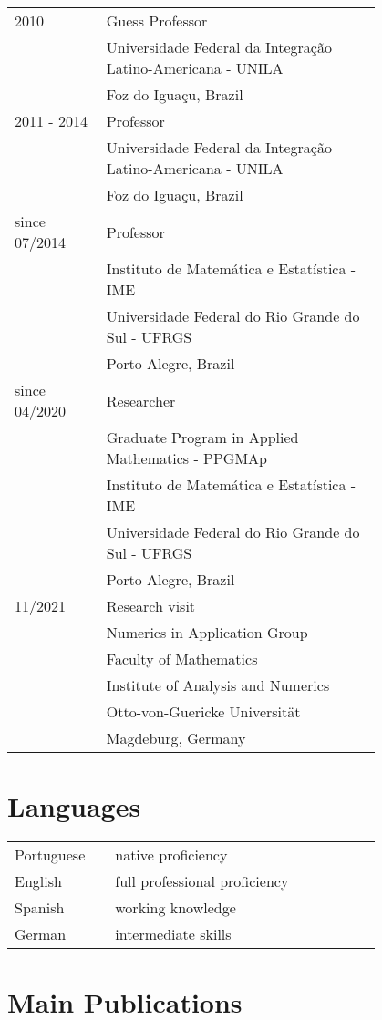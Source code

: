 \documentclass[a4paper,12pt]{article}
\begin{document}
\begin{longtable}[H]{p{0.2\linewidth}p{0.6\linewidth}}
  2010 & Guess Professor \\
  & Universidade Federal da Integração Latino-Americana - UNILA\\
  & Foz do Iguaçu, Brazil\\
  2011 - 2014 & Professor \\
  & Universidade Federal da Integração Latino-Americana - UNILA\\
  & Foz do Iguaçu, Brazil\\
  since 07/2014 & Professor \\
  & Instituto de Matemática e Estatística - IME\\
  & Universidade Federal do Rio Grande do Sul - UFRGS\\
  & Porto Alegre, Brazil\\
  since 04/2020 & Researcher\\
  & Graduate Program in Applied Mathematics - PPGMAp\\
  & Instituto de Matemática e Estatística - IME\\
  & Universidade Federal do Rio Grande do Sul - UFRGS\\
  & Porto Alegre, Brazil\\
  11/2021 & Research visit\\
  & Numerics in Application Group\\
  & Faculty of Mathematics\\
  & Institute of Analysis and Numerics\\
  & Otto-von-Guericke Universität \\
  & Magdeburg, Germany
\end{longtable}


\section{Languages}

\begin{longtable}[H]{p{0.2\linewidth}p{0.6\linewidth}}
  Portuguese & native proficiency \\
  English    & full professional proficiency \\
  Spanish    & working knowledge \\
  German     & intermediate skills
\end{longtable}

\section*{Main Publications}
\end{document}
